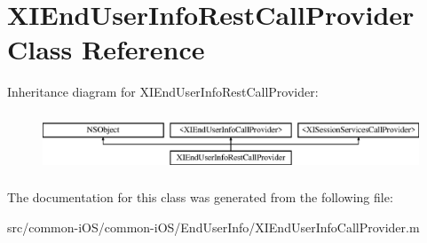 \hypertarget{class_x_i_end_user_info_rest_call_provider}{}\section{X\+I\+End\+User\+Info\+Rest\+Call\+Provider Class Reference}
\label{class_x_i_end_user_info_rest_call_provider}
Inheritance diagram for X\+I\+End\+User\+Info\+Rest\+Call\+Provider\+:\begin{figure}[H]
\begin{center}
\leavevmode
\includegraphics[height=1.769352cm]{class_x_i_end_user_info_rest_call_provider}
\end{center}
\end{figure}


The documentation for this class was generated from the following file\+:\begin{DoxyCompactItemize}
\item 
src/common-\/i\+O\+S/common-\/i\+O\+S/\+End\+User\+Info/X\+I\+End\+User\+Info\+Call\+Provider.\+m\end{DoxyCompactItemize}
